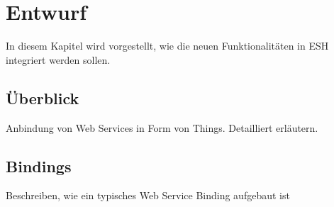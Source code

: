 \chapter{Entwurf}
\label{chap:entwurf}
In diesem Kapitel wird vorgestellt, wie die neuen Funktionalitäten in ESH integriert werden sollen.

\section{Überblick}
Anbindung von Web Services in Form von Things. Detailliert erläutern.


\section{Bindings}
Beschreiben, wie ein typisches Web Service Binding aufgebaut ist




